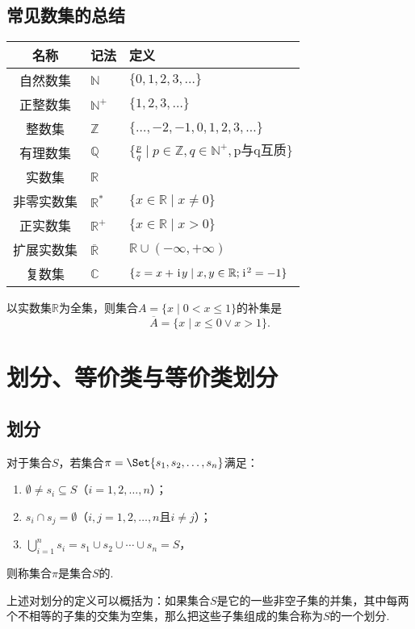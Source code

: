 \subsection{常见数集的总结}
\begin{center}
\begin{tabular}{c|l|l}
\hline
名称 & 记法 & 定义 \\ \hline
自然数集 & \(\mathbb{N}\) & \(\{ 0,1,2,3,\dotsc \}\) \\
正整数集 & \(\mathbb{N}^+\) & \(\{ 1,2,3,\dotsc \}\) \\
整数集 & \(\mathbb{Z}\) & \(\{ \dotsc,-2,-1,0,1,2,3,\dotsc \}\) \\
有理数集 & \(\mathbb{Q}\) & \(\{ \frac{p}{q} \mid p \in \mathbb{Z}, q \in \mathbb{N}^+, \text{p与q互质} \}\) \\
实数集 & \(\mathbb{R}\) \\
非零实数集 & \(\mathbb{R}^*\) & \(\{ x \in \mathbb{R} \mid x \neq 0 \}\) \\
正实数集 & \(\mathbb{R}^+\) & \(\{ x \in \mathbb{R} \mid x > 0 \}\) \\
扩展实数集 & \(\overline{\mathbb{R}}\) & \(\mathbb{R} \cup (-\infty,+\infty)\) \\
复数集 & \(\mathbb{C}\) & \(\{ z = x + \kern1pt\mathrm{i}\kern1pt y \mid x,y \in \mathbb{R}; \kern1pt\mathrm{i}\kern1pt^2 = -1 \}\) \\ \hline
\end{tabular}
\end{center}

\begin{example}
以实数集\(\mathbb{R}\)为全集，则集合\(A = \{ x \mid 0 < x \leqslant 1 \}\)的补集是\[
\overline{A} = \{ x \mid x \leqslant 0 \lor x > 1 \}.
\]
\end{example}

\section{划分、等价类与等价类划分}
\subsection{划分}
\begin{definition}
对于集合\(S\)，若集合\(\pi = \Set{ s_1,s_2,\dotsc,s_n }\)满足：
\begin{enumerate}
 \item \(\emptyset \neq s_i \subseteq S\)（\(i=1,2,\dotsc,n\)）；
 \item \(s_i \cap s_j = \emptyset\)（\(i,j=1,2,\dotsc,n\)且\(i \neq j\)）；
 \item \(\bigcup\limits_{i=1}^n s_i = s_1 \cup s_2 \cup \dotsb \cup s_n = S\)，%
\end{enumerate}
则称集合\(\pi\)是集合\(S\)的.
\end{definition}
上述对划分的定义可以概括为：如果集合\(S\)是它的一些非空子集的并集，其中每两个不相等的子集的交集为空集，那么把这些子集组成的集合称为\(S\)的一个划分.


